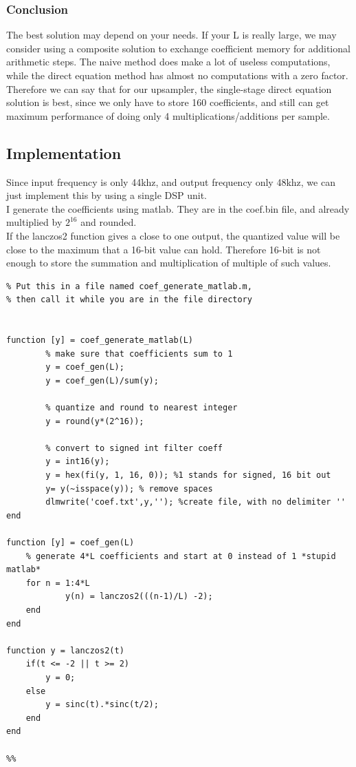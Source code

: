 \documentclass[a4paper,twoside,11pt, fleqn]{article}
\begin{document}
\subsubsection{Conclusion}
The best solution may depend on your needs. If your L is really large, we may consider using a composite solution to exchange coefficient memory for additional arithmetic steps. The naive method does make a lot of useless computations, while the direct equation method has almost no computations with a zero factor.\\

Therefore we can say that for our upsampler, the single-stage direct equation solution is best, since we only have to store 160 coefficients, and still can get maximum performance of doing only 4 multiplications/additions per sample.

\newpage
\subsection{Implementation}
Since input frequency is only 44khz, and output frequency only 48khz, we can just implement this by using a single DSP unit.\\

I generate the coefficients using matlab. They are in the coef.bin file, and already multiplied by $2^{16}$ and rounded.\\

If the lanczos2 function gives a close to one output, the quantized value will be close to the maximum that a 16-bit value can hold. Therefore 16-bit is not enough to store the summation and multiplication of multiple of such values.\\

\begin{lstlisting}
% Put this in a file named coef_generate_matlab.m, 
% then call it while you are in the file directory


function [y] = coef_generate_matlab(L)
        % make sure that coefficients sum to 1
        y = coef_gen(L);
        y = coef_gen(L)/sum(y);

        % quantize and round to nearest integer
        y = round(y*(2^16)); 
             
        % convert to signed int filter coeff
        y = int16(y);
        y = hex(fi(y, 1, 16, 0)); %1 stands for signed, 16 bit out
        y= y(~isspace(y)); % remove spaces
        dlmwrite('coef.txt',y,''); %create file, with no delimiter ''      
end

function [y] = coef_gen(L)
    % generate 4*L coefficients and start at 0 instead of 1 *stupid matlab*
    for n = 1:4*L
            y(n) = lanczos2(((n-1)/L) -2);
    end
end

function y = lanczos2(t)
    if(t <= -2 || t >= 2)
        y = 0;
    else
        y = sinc(t).*sinc(t/2);
    end
end

%%



\end{lstlisting}
\end{document}
